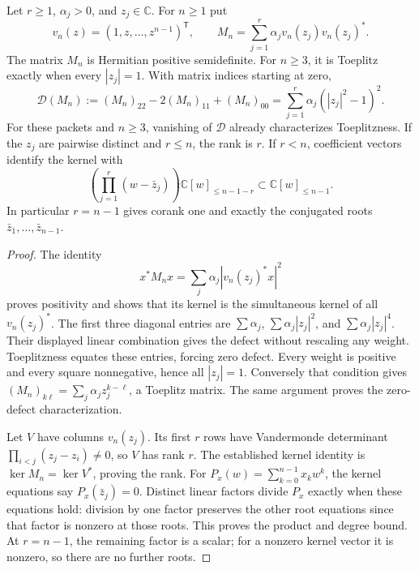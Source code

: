 \begin{theorem}
\label{thm:sz-finite-packet}
Let $r\ge1$, $\alpha_j>0$, and $z_j\in\mathbb C$. For $n\ge1$ put
\[
v_n(z)=(1,z,\ldots,z^{n-1})^\mathsf T,\qquad
M_n=\sum_{j=1}^r\alpha_jv_n(z_j)v_n(z_j)^* .
\]
The matrix $M_n$ is Hermitian positive semidefinite. For $n\ge3$, it is Toeplitz exactly when every $|z_j|=1$. With matrix indices starting at zero,
\[
\mathcal D(M_n):=(M_n)_{22}-2(M_n)_{11}+(M_n)_{00}
=\sum_{j=1}^r\alpha_j(|z_j|^2-1)^2.
\]
For these packets and $n\ge3$, vanishing of $\mathcal D$ already characterizes Toeplitzness.
If the $z_j$ are pairwise distinct and $r\le n$, the rank is $r$. If $r<n$, coefficient vectors identify the kernel with
\[
\left(\prod_{j=1}^r(w-\bar z_j)\right)\mathbb C[w]_{\le n-1-r}
\subset\mathbb C[w]_{\le n-1}.
\]
In particular $r=n-1$ gives corank one and exactly the conjugated roots $\bar z_1,\ldots,\bar z_{n-1}$.
\end{theorem}
\begin{proof}
The identity
\[
x^*M_nx=\sum_j\alpha_j|v_n(z_j)^*x|^2
\]
proves positivity and shows that its kernel is the simultaneous kernel of all $v_n(z_j)^*$. The first three diagonal entries are $\sum\alpha_j$, $\sum\alpha_j|z_j|^2$, and $\sum\alpha_j|z_j|^4$. Their displayed linear combination gives the defect without rescaling any weight. Toeplitzness equates these entries, forcing zero defect. Every weight is positive and every square nonnegative, hence all $|z_j|=1$. Conversely that condition gives $(M_n)_{k\ell}=\sum_j\alpha_jz_j^{k-\ell}$, a Toeplitz matrix. The same argument proves the zero-defect characterization.

Let $V$ have columns $v_n(z_j)$. Its first $r$ rows have Vandermonde determinant $\prod_{i<j}(z_j-z_i)\ne0$, so $V$ has rank $r$. The established kernel identity is $\ker M_n=\ker V^*$, proving the rank. For $P_x(w)=\sum_{k=0}^{n-1}x_kw^k$, the kernel equations say $P_x(\bar z_j)=0$. Distinct linear factors divide $P_x$ exactly when these equations hold: division by one factor preserves the other root equations since that factor is nonzero at those roots. This proves the product and degree bound. At $r=n-1$, the remaining factor is a scalar; for a nonzero kernel vector it is nonzero, so there are no further roots.
\end{proof}

